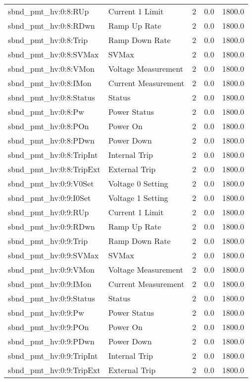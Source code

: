 \begin{center}
\begin{longtable}{l | l l l l }
sbnd\_pmt\_hv:0:8:RUp & Current 1 Limit & 2 & 0.0 & 1800.0\\ 
sbnd\_pmt\_hv:0:8:RDwn & Ramp Up Rate & 2 & 0.0 & 1800.0\\ 
sbnd\_pmt\_hv:0:8:Trip & Ramp Down Rate & 2 & 0.0 & 1800.0\\ 
sbnd\_pmt\_hv:0:8:SVMax & SVMax & 2 & 0.0 & 1800.0\\ 
sbnd\_pmt\_hv:0:8:VMon & Voltage Measurement & 2 & 0.0 & 1800.0\\ 
sbnd\_pmt\_hv:0:8:IMon & Current Measurement & 2 & 0.0 & 1800.0\\ 
sbnd\_pmt\_hv:0:8:Status & Status & 2 & 0.0 & 1800.0\\ 
sbnd\_pmt\_hv:0:8:Pw & Power Status & 2 & 0.0 & 1800.0\\ 
sbnd\_pmt\_hv:0:8:POn & Power On & 2 & 0.0 & 1800.0\\ 
sbnd\_pmt\_hv:0:8:PDwn & Power Down & 2 & 0.0 & 1800.0\\ 
sbnd\_pmt\_hv:0:8:TripInt & Internal Trip & 2 & 0.0 & 1800.0\\ 
sbnd\_pmt\_hv:0:8:TripExt & External Trip & 2 & 0.0 & 1800.0\\ 
sbnd\_pmt\_hv:0:9:V0Set & Voltage 0 Setting & 2 & 0.0 & 1800.0\\ 
sbnd\_pmt\_hv:0:9:I0Set & Voltage 1 Setting & 2 & 0.0 & 1800.0\\ 
sbnd\_pmt\_hv:0:9:RUp & Current 1 Limit & 2 & 0.0 & 1800.0\\ 
sbnd\_pmt\_hv:0:9:RDwn & Ramp Up Rate & 2 & 0.0 & 1800.0\\ 
sbnd\_pmt\_hv:0:9:Trip & Ramp Down Rate & 2 & 0.0 & 1800.0\\ 
sbnd\_pmt\_hv:0:9:SVMax & SVMax & 2 & 0.0 & 1800.0\\ 
sbnd\_pmt\_hv:0:9:VMon & Voltage Measurement & 2 & 0.0 & 1800.0\\ 
sbnd\_pmt\_hv:0:9:IMon & Current Measurement & 2 & 0.0 & 1800.0\\ 
sbnd\_pmt\_hv:0:9:Status & Status & 2 & 0.0 & 1800.0\\ 
sbnd\_pmt\_hv:0:9:Pw & Power Status & 2 & 0.0 & 1800.0\\ 
sbnd\_pmt\_hv:0:9:POn & Power On & 2 & 0.0 & 1800.0\\ 
sbnd\_pmt\_hv:0:9:PDwn & Power Down & 2 & 0.0 & 1800.0\\ 
sbnd\_pmt\_hv:0:9:TripInt & Internal Trip & 2 & 0.0 & 1800.0\\ 
sbnd\_pmt\_hv:0:9:TripExt & External Trip & 2 & 0.0 & 1800.0\\ 

\end{longtable}
\end{center}
